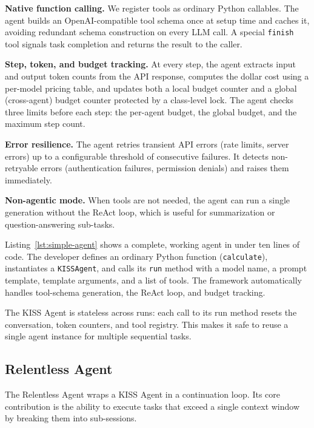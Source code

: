 \documentclass{article}
\begin{document}
\textbf{Native function calling.}  We register tools as ordinary Python callables.  The agent builds an OpenAI-compatible tool schema once at setup time and caches it, avoiding redundant schema construction on every LLM call.  A special \texttt{finish} tool signals task completion and returns the result to the caller.

\textbf{Step, token, and budget tracking.}  At every step, the agent extracts input and output token counts from the API response, computes the dollar cost using a per-model pricing table, and updates both a local budget counter and a global (cross-agent) budget counter protected by a class-level lock.  The agent checks three limits before each step: the per-agent budget, the global budget, and the maximum step count.

\textbf{Error resilience.}  The agent retries transient API errors (rate limits, server errors) up to a configurable threshold of consecutive failures.  It detects non-retryable errors (authentication failures, permission denials) and raises them immediately.

\textbf{Non-agentic mode.}  When tools are not needed, the agent can run a single generation without the ReAct loop, which is useful for summarization or question-answering sub-tasks.

Listing~\ref{lst:simple-agent} shows a complete, working agent in under ten lines of code.  The developer defines an ordinary Python function (\texttt{calculate}), instantiates a \texttt{KISSAgent}, and calls its \texttt{run} method with a model name, a prompt template, template arguments, and a list of tools.  The framework automatically handles tool-schema generation, the ReAct loop, and budget tracking.

The KISS Agent is stateless across runs: each call to its run method resets the conversation, token counters, and tool registry.  This makes it safe to reuse a single agent instance for multiple sequential tasks.

\subsection{Relentless Agent}
\label{sec:relentless-agent}

The Relentless Agent wraps a KISS Agent in a continuation loop.  Its core contribution is the ability to execute tasks that exceed a single context window by breaking them into sub-sessions.
\end{document}
